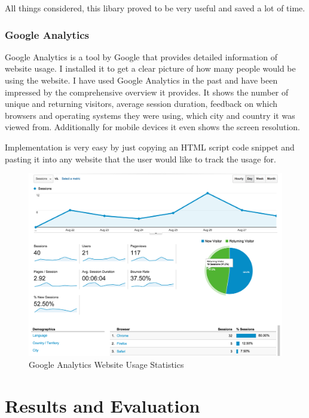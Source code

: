 \documentclass[a4paper,11pt,titlepage]{article}
\begin{document}
All things considered, this libary proved to be very useful and saved a lot of time.




\subsubsection{Google Analytics}

Google Analytics is a tool by Google that provides detailed information of website usage. I installed it to get a clear picture of how many people would be using the website. I have used Google Analytics in the past and have been impressed by the comprehensive overview it provides. It shows the number of unique and returning visitors, average session duration, feedback on which browsers and operating systems they were using, which city and country it was viewed from. Additionally for mobile devices it even shows the screen resolution.

Implementation is very easy by just copying an HTML script code snippet and pasting it into any website that the user would like to track the usage for.

\begin{figure}[ht!]
\centering
\includegraphics[width=160mm]{graphics/googleAnalytics_01.png}
\caption{Google Analytics Website Usage Statistics}
\label{fig:UIdesign1}
\end{figure}












\section{Results and Evaluation}
\end{document}
